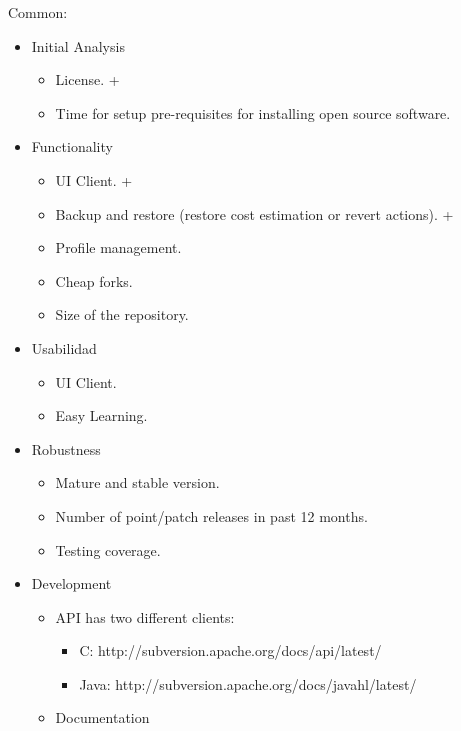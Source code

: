 \documentclass[11pt]{scrartcl}
\begin{document}
Common:
\begin{itemize}

    \item Initial Analysis
        \begin{itemize}
+            \item License.
+            \item Time for setup pre-requisites for installing open source software. 
        \end{itemize}

    \item Functionality
        \begin{itemize}
+            \item UI Client.
+            \item Backup and restore (restore cost estimation or revert actions).
+            \item Profile management.
            \item Cheap forks.
            \item Size of the repository.
        \end{itemize}

    \item Usabilidad
        \begin{itemize}
            \item UI Client.
            \item Easy Learning.
        \end{itemize}
    
    \item Robustness
        \begin{itemize}
            \item Mature and stable version.
            \item Number of point/patch releases in past 12 months.
            \item Testing coverage.
        \end{itemize}

    \item Development
        \begin{itemize}
            \item API has two different clients:
            \begin{itemize}
                \item C: http://subversion.apache.org/docs/api/latest/ 
                \item Java: http://subversion.apache.org/docs/javahl/latest/
            \end{itemize}
            \item Documentation
        \end{itemize}


\end{itemize}
\end{document}
